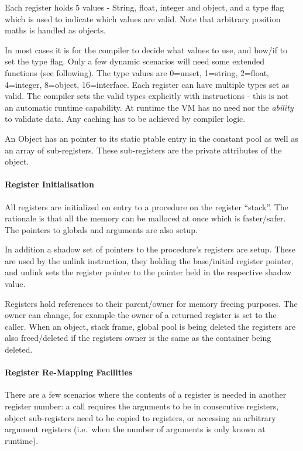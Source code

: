 Each register holds 5 values - String, float, integer and object, and a
type flag which is used to indicate which values are valid. Note that
arbitrary position maths is handled as objects.

In most cases it is for the compiler to decide what values to use, and
how/if to set the type flag. Only a few dynamic scenarios will need some
extended functions (see following). The type values are 0=unset,
1=string, 2=float, 4=integer, 8=object, 16=interface. Each register can
have multiple types set as valid. The compiler sets the valid types
explicitly with instructions - this is not an automatic runtime
capability. At runtime the VM has no need nor the \emph{ability} to
validate data. Any caching has to be achieved by compiler logic.

An Object has an pointer to its static ptable entry in the constant pool
as well as an array of sub-registers. These sub-registers are the
private attributes of the object.

\hypertarget{register-initialisation}{%
\paragraph{Register Initialisation}\label{register-initialisation}}

All registers are initialized on entry to a procedure on the register
``stack''. The rationale is that all the memory can be malloced at once
which is faster/safer. The pointers to globals and arguments are also
setup.

In addition a shadow set of pointers to the procedure's registers are
setup. These are used by the unlink instruction, they holding the
base/initial register pointer, and unlink sets the register pointer to
the pointer held in the respective shadow value.

Registers hold references to their parent/owner for memory freeing
purposes. The owner can change, for example the owner of a returned
register is set to the caller. When an object, stack frame, global pool
is being deleted the registers are also freed/deleted if the registers
owner is the same as the container being deleted.

\hypertarget{register-re-mapping-facilities}{%
\paragraph{Register Re-Mapping
Facilities}\label{register-re-mapping-facilities}}

There are a few scenarios where the contents of a register is needed in
another register number: a call requires the arguments to be in
consecutive registers, object sub-registers need to be copied to
registers, or accessing an arbitrary argument registers (i.e.~when the
number of arguments is only known at runtime).

